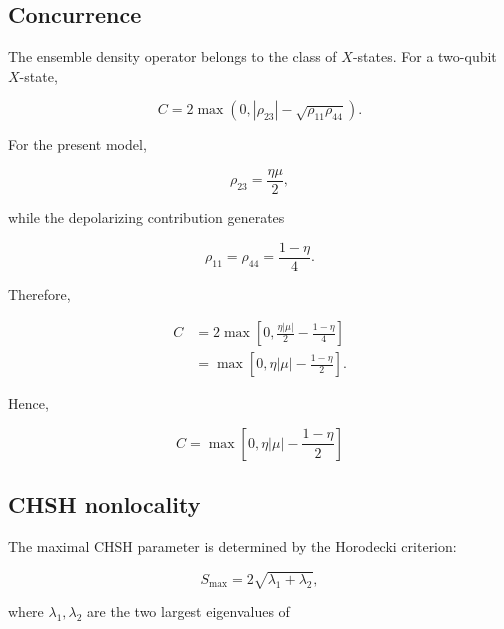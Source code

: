 \subsection*{Concurrence}

The ensemble density operator belongs to the class of \(X\)-states. For a two-qubit \(X\)-state,

\begin{equation}
C
=
2
\max
\left(
0,
|\rho_{23}|
-
\sqrt{\rho_{11}\rho_{44}}
\right).
\label{eq:appendix_xstate_concurrence}
\end{equation}

For the present model,

\begin{equation}
\rho_{23}
=
\frac{\eta\mu}{2},
\end{equation}

while the depolarizing contribution generates

\begin{equation}
\rho_{11}
=
\rho_{44}
=
\frac{1-\eta}{4}.
\end{equation}

Therefore,

\begin{align}
C
&=
2
\max
\left[
0,
\frac{\eta|\mu|}{2}
-
\frac{1-\eta}{4}
\right]
\nonumber
\\
&=
\max
\left[
0,
\eta|\mu|
-
\frac{1-\eta}{2}
\right].
\end{align}

Hence,

\begin{equation}
\boxed{
C
=
\max
\left[
0,
\eta|\mu|
-
\frac{1-\eta}{2}
\right]
}
\label{eq:appendix_ensemble_concurrence}
\end{equation}


\subsection*{CHSH nonlocality}

The maximal CHSH parameter is determined by the Horodecki criterion:

\begin{equation}
S_{\max}
=
2
\sqrt{
\lambda_1+\lambda_2
},
\end{equation}

where \( \lambda_1,\lambda_2 \) are the two largest eigenvalues of

